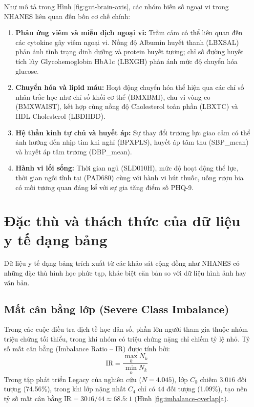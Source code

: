 Như mô tả trong Hình \ref{fig:gut-brain-axis}, các nhóm biến số ngoại vi trong NHANES liên quan đến bốn cơ chế chính:
\begin{enumerate}
    \item \textbf{Phản ứng viêm và miễn dịch ngoại vi:} Trầm cảm có thể liên quan đến các cytokine gây viêm ngoại vi. Nồng độ Albumin huyết thanh (LBXSAL) phản ánh tình trạng dinh dưỡng và protein huyết tương; chỉ số đường huyết tích lũy Glycohemoglobin HbA1c (LBXGH) phản ánh mức độ chuyển hóa glucose.
    \item \textbf{Chuyển hóa và lipid máu:} Hoạt động chuyển hóa thể hiện qua các chỉ số nhân trắc học như chỉ số khối cơ thể (BMXBMI), chu vi vòng eo (BMXWAIST), kết hợp cùng nồng độ Cholesterol toàn phần (LBXTC) và HDL-Cholesterol (LBDHDD).
    \item \textbf{Hệ thần kinh tự chủ và huyết áp:} Sự thay đổi trương lực giao cảm có thể ảnh hưởng đến nhịp tim khi nghỉ (BPXPLS), huyết áp tâm thu (SBP\_mean) và huyết áp tâm trương (DBP\_mean).
    \item \textbf{Hành vi lối sống:} Thời gian ngủ (SLD010H), mức độ hoạt động thể lực, thời gian ngồi tĩnh tại (PAD680) cùng với hành vi hút thuốc, uống rượu bia có mối tương quan đáng kể với sự gia tăng điểm số PHQ-9.
\end{enumerate}

\section{Đặc thù và thách thức của dữ liệu y tế dạng bảng}
\label{sec:dac-thu-du-lieu-bang}

Dữ liệu y tế dạng bảng trích xuất từ các khảo sát cộng đồng như NHANES có những đặc thù hình học phức tạp, khác biệt căn bản so với dữ liệu hình ảnh hay văn bản.

\subsection{Mất cân bằng lớp (Severe Class Imbalance)}
\label{subsec:mat-can-bang-lop}

Trong các cuộc điều tra dịch tễ học dân số, phần lớn người tham gia thuộc nhóm triệu chứng tối thiểu, trong khi nhóm có triệu chứng nặng chỉ chiếm tỷ lệ nhỏ. Tỷ số mất cân bằng (Imbalance Ratio -- IR) được tính bởi:
\begin{equation}
    \text{IR} = \frac{\max_k N_k}{\min_k N_k}
\end{equation}
Trong tập phát triển Legacy của nghiên cứu ($N = 4.045$), lớp $C_0$ chiếm $3.016$ đối tượng (74.56\%), trong khi lớp nặng nhất $C_4$ chỉ có $44$ đối tượng (1.09\%), tạo nên tỷ số mất cân bằng $\text{IR} = 3016 / 44 \approx 68.5:1$ (Hình \ref{fig:imbalance-overlap}a).

